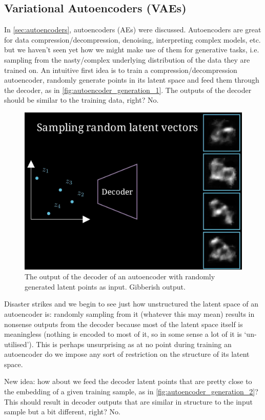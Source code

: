 \documentclass[11pt]{article}
\begin{document}
\subsection{Variational Autoencoders (VAEs)}
In \autoref{sec:autoencoders}, autoencoders (AEs) were discussed. Autoencoders are great for data compression/decompression, denoising, interpreting complex models, etc. but we haven't seen yet how we might make use of them for generative tasks, i.e. sampling from the nasty/complex underlying distribution of the data they are trained on. An intuitive first idea is to train a compression/decompression autoencoder, randomly generate points in its latent space and feed them through the decoder, as in \autoref{fig:autoencoder_generation_1}. The outputs of the decoder should be similar to the training data, right? No.

\begin{figure}[ht]
    \centering
    \includegraphics[width=0.60\columnwidth]{./figures/generative_models/AEs_gen_1.png}
    \caption{\centering The output of the decoder of an autoencoder with randomly generated latent points as input. Gibberish output.}
    \label{fig:autoencoder_generation_1}
\end{figure}

Disaster strikes and we begin to see just how unstructured the latent space of an autoencoder is: randomly sampling from it (whatever this may mean) results in nonsense outputs from the decoder because most of the latent space itself is meaningless (nothing is encoded to most of it, so in some sense a lot of it is `un-utilised'). This is perhaps unsurprising as at no point during training an autoencoder do we impose any sort of restriction on the structure of its latent space.

New idea: how about we feed the decoder latent points that are pretty close to the embedding of a given training sample, as in \autoref{fig:autoencoder_generation_2}? This should result in decoder outputs that are similar in structure to the input sample but a bit different, right? No.
\end{document}
